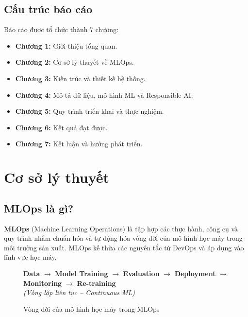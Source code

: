 \documentclass[12pt,a4paper]{report}
\begin{document}
\section{Cấu trúc báo cáo}

Báo cáo được tổ chức thành 7 chương:
\begin{itemize}
  \item \textbf{Chương 1:} Giới thiệu tổng quan.
  \item \textbf{Chương 2:} Cơ sở lý thuyết về MLOps.
  \item \textbf{Chương 3:} Kiến trúc và thiết kế hệ thống.
  \item \textbf{Chương 4:} Mô tả dữ liệu, mô hình ML và Responsible AI.
  \item \textbf{Chương 5:} Quy trình triển khai và thực nghiệm.
  \item \textbf{Chương 6:} Kết quả đạt được.
  \item \textbf{Chương 7:} Kết luận và hướng phát triển.
\end{itemize}

\chapter{Cơ sở lý thuyết}

\section{MLOps là gì?}

\textbf{MLOps} (Machine Learning Operations) là tập hợp các thực hành, công cụ và quy trình nhằm chuẩn hóa và tự động hóa vòng đời của mô hình học máy trong môi trường sản xuất. MLOps kế thừa các nguyên tắc từ DevOps và áp dụng vào lĩnh vực học máy.

\begin{figure}[H]
  \centering
  \begin{tcolorbox}[colback=blue!3, colframe=blue!40, arc=5pt, boxrule=1pt]
    \centering
    \large
    \textbf{Data} $\rightarrow$ \textbf{Model Training} $\rightarrow$ \textbf{Evaluation} $\rightarrow$ \textbf{Deployment} $\rightarrow$ \textbf{Monitoring} $\rightarrow$ \textbf{Re-training}
    \vspace{0.3cm}\\
    \textit{(Vòng lặp liên tục -- Continuous ML)}
  \end{tcolorbox}
  \caption{Vòng đời của mô hình học máy trong MLOps}
  \label{fig:mlops-lifecycle}
\end{figure}
\end{document}
